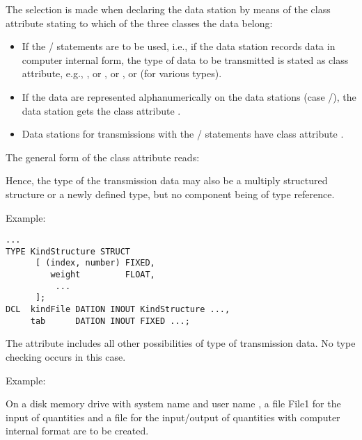 The selection is made when declaring the data station by means of the
class attribute stating to which of the three classes the data belong:
\begin{itemize}
\item If the / statements are to be used, i.e., if the data
station records data in computer internal form, the type of data to be
transmitted is stated as class attribute, e.g., , or , %
or , or   (for various types).
\item If the data are represented alphanumerically on the data stations
(case /), the data station gets the class attribute 
 .
\item Data stations for transmissions with the / statements
have class attribute  .
\end{itemize}

The general form of the class attribute reads:

\begin{grammarframe}






\end{grammarframe}

Hence, the type of the transmission data may also be a multiply
structured structure or a newly defined type, but no component being of
type reference.

Example:

\begin{lstlisting}
...
TYPE KindStructure STRUCT 
      [ (index, number) FIXED,
         weight         FLOAT,
          ...
      ];
DCL  kindFile DATION INOUT KindStructure ...,
     tab      DATION INOUT FIXED ...;
\end{lstlisting}

The attribute  includes all other possibilities of type of
transmission data.
No type checking occurs in this case.

Example:

On a disk memory drive with system name
  and user name , a file
File1 for the input of  quantities and a file  for the
input/output of  quantities with computer internal format are to be
created.

